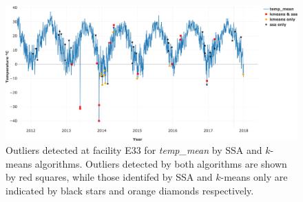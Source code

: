 \begin{figure}[ht]
    \centering
    \includegraphics[width=\textwidth]{figures/combined.png}
    \caption{Outliers detected at facility E33 for \textit{temp\_mean}
		by SSA and $k$-means algorithms. Outliers detected by both
		algorithms are shown by red squares, while those identifed by
		SSA and $k$-means only are indicated by black stars and orange
		diamonds respectively.}
    \label{fig:combined}
\end{figure}


